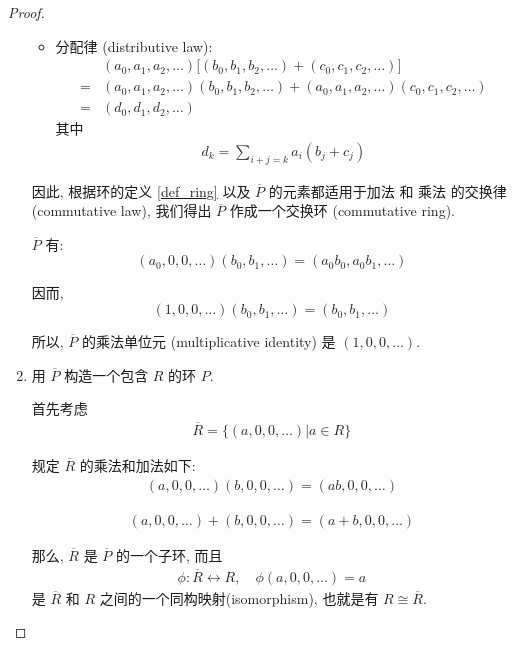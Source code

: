 \documentclass[utf8]{ctexbook}
\theoremstyle{definition}
\begin{document}
\begin{proof}
\begin{enumerate}
{\begin{itemize}
{}
\item{分配律 (distributive law):
\begin{align*}
& (a_0, a_1, a_2, \ldots)\big[ (b_0, b_1, b_2, \ldots) + (c_0, c_1, c_2, \ldots) \big]\\
= &  (a_0, a_1, a_2, \ldots)  (b_0, b_1, b_2, \ldots) + (a_0, a_1, a_2, \ldots)  (c_0, c_1, c_2, \ldots) \\
= & (d_0, d_1, d_2, \ldots)
\end{align*}
其中
\begin{align*}
d_k = \sum_{i+j=k} a_i (b_j + c_j)
\end{align*}
}
\end{itemize}

因此, 根据环的定义 \ref{def_ring} 以及 $\overline{P}$ 的元素都适用于加法 和 乘法 的交换律 (commutative law), 我们得出 $\overline{P}$ 作成一个交换环 (commutative ring).

$\overline{P}$ 有:
\begin{equation}
(a_0, 0, 0, \ldots) (b_0, b_1, \ldots) = (a_0 b_0, a_0 b_1, \ldots )
\end{equation}

因而, 
\begin{equation}
(1,0,0,\ldots) (b_0, b_1, \ldots) = (b_0, b_1, \ldots ) \nonumber
\end{equation}

所以, $\overline{P}$ 的乘法单位元 (multiplicative identity) 是 $(1, 0, 0, \ldots)$.

}
\item{用 $\overline{P}$ 构造一个包含 $R$ 的环 $P$.

首先考虑 
\begin{align*}
\overline{R} = \{ (a, 0, 0, \ldots) | a \in R \}
\end{align*}

规定 $\overline{R} $ 的乘法和加法如下:
\begin{align*}
(a, 0, 0, \ldots) (b, 0, 0, \ldots) = (ab, 0, 0, \ldots)
\end{align*}

\begin{align*}
(a, 0, 0, \ldots) + (b, 0, 0, \ldots) = (a + b, 0, 0, \ldots)
\end{align*}

那么, $\overline{R}$ 是 $\overline{P}$ 的一个子环, 而且
\begin{align*}
\phi : \overline{R} \longleftrightarrow  R , \quad \phi(a,0,0, \ldots) = a  
\end{align*}
是 $\overline{R}$ 和 $R$ 之间的一个同构映射(isomorphism), 也就是有 $R \cong \overline{R}$.

}
\end{enumerate}
\end{proof}
\end{document}
